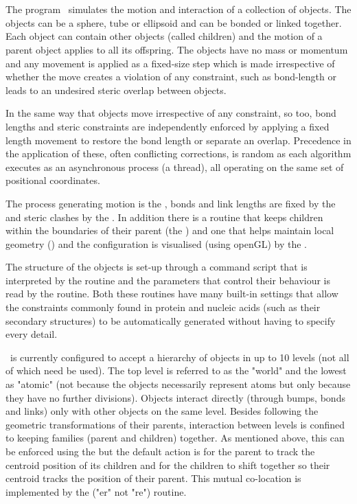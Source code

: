 \section{}

The program \NAME\ simulates the motion and interaction of a collection of objects.
The objects can be a sphere, tube or ellipsoid and can be bonded or linked together.
Each object can contain other objects (called children) and the motion of a parent
object applies to all its offspring.   The objects have no mass or momentum and any
movement is applied as a fixed-size step which is made irrespective of whether the
move creates a violation of any constraint, such as bond-length or leads to an 
undesired steric overlap between objects.   

In the same way that objects move irrespective of any constraint, so too, bond
lengths and steric constraints are independently enforced by applying a fixed length
movement to restore the bond length or separate an overlap.  Precedence in the application
of these, often conflicting corrections, is random as each algorithm executes as an
asynchronous process (a thread), all operating on the same set of positional coordinates.

The process generating motion is the , bonds and link lengths are fixed
by the  and steric clashes by the .   In addition there is a 
routine that keeps children within the boundaries of their parent (the 
) and one that helps maintain local geometry () and the
configuration is visualised (using openGL) by the .

The structure of the objects is set-up through a command script that is interpreted
by the  routine and the parameters that control their behaviour is read
by the  routine.   Both these routines have many built-in settings that
allow the constraints commonly found in protein and nucleic acids (such as their
secondary structures) to be automatically generated without having to specify every
detail.

\NAME\ is currently configured to accept a hierarchy of objects in up to 10 levels
(not all of which need be used).   The top level is referred to as the "world" and
the lowest as "atomic" (not because the objects necessarily represent atoms but only
because they have no further divisions).  Objects interact directly (through bumps,
bonds and links) only with other objects on the same level.   Besides following the
geometric transformations of their parents, interaction between levels is confined 
to keeping families (parent and children) together.   As mentioned above, this can
be enforced using the  but the default action is for the parent to track
the centroid position of its children and for the children to shift together so their
centroid tracks the position of their parent.   This mutual co-location is implemented
by the  ("er" not "re") routine.

